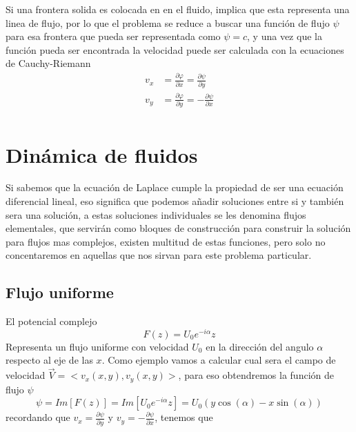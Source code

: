 \documentclass[12pt]{article}
\begin{document}

	Si una frontera solida es colocada en en el fluido, implica que esta representa una linea de flujo, por lo que el problema se reduce  a buscar una función de flujo $\psi$ para esa frontera que pueda ser representada como $\psi=c$, y una vez que la función pueda ser encontrada la velocidad puede ser calculada con la ecuaciones de Cauchy-Riemann
	\begin{equation}
		\begin{split}
			v_x &= \frac{\partial \varphi}{\partial x} = \frac{\partial \psi}{\partial y } \\
			v_y &= \frac{\partial \varphi}{\partial y} =- \frac{\partial \psi}{\partial x } \\
		\end{split}
	\end{equation}
	
\section{Dinámica de fluidos}
		Si sabemos que la ecuación de Laplace cumple la propiedad de ser una ecuación diferencial lineal, eso significa que podemos añadir soluciones entre si y también sera una solución, a estas soluciones individuales se les denomina flujos elementales, que servirán como bloques de construcción para construir la solución para flujos mas complejos, existen multitud de estas funciones, pero solo no concentaremos en aquellas que nos sirvan para este problema particular.
		\subsection{Flujo uniforme}
			El potencial complejo 
			\begin{equation}
				F(z) = U_0 e^{-i\alpha}z
			\end{equation}
			Representa un flujo uniforme con velocidad $U_0$ en la dirección del angulo $\alpha$ respecto al eje de las $x$.
			Como ejemplo vamos a calcular cual sera el campo de velocidad $\vec{V}=<v_x (x,y),v_y (x,y)>$, para eso obtendremos la función de flujo $\psi$
			\begin{equation}
				\psi = Im[F(z)] = Im[U_0 e^{-i\alpha}z] =	U_0(y \cos{\left(\alpha \right)}- x \sin{\left(\alpha \right)} )
			\end{equation}
			recordando que $v_x = \frac{\partial \psi}{\partial y}$ y $ v_y = -\frac{\partial \psi}{\partial x}$, tenemos que
			
\end{document}
